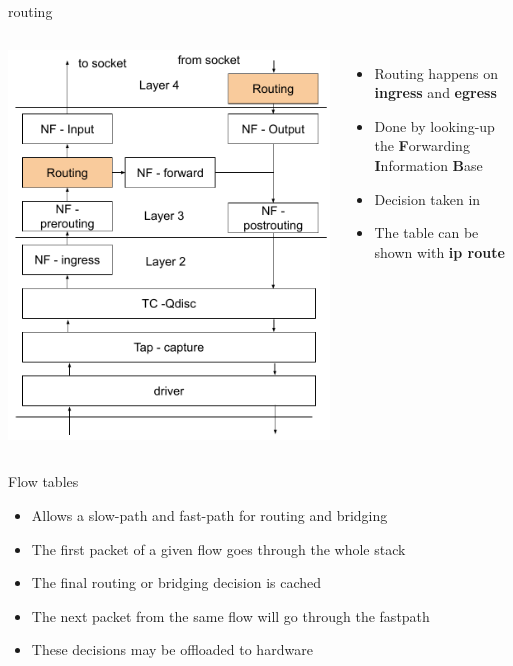\begin{frame}{routing}
	\begin{columns}
		\includegraphics[width=1\textwidth]{slides/networking-skb/routing.pdf}
		\begin{itemize}
			\item Routing happens on \textbf{ingress} and \textbf{egress}
			\item Done by looking-up the \textbf{F}orwarding \textbf{I}nformation \textbf{B}ase
			\item Decision taken in 
			\item The table can be shown with \textbf{ip route}
		\end{itemize}
	\end{columns}
\end{frame}

\begin{frame}{Flow tables}
	\begin{itemize}
		\item Allows a slow-path and fast-path for routing and bridging
		\item The first packet of a given flow goes through the whole stack
		\item The final routing or bridging decision is cached
		\item The next packet from the same flow will go through the fastpath
		\item These decisions may be offloaded to hardware
	\end{itemize}
\end{frame}


